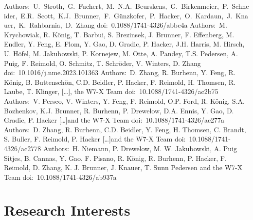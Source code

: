 \documentclass[11pt,a4paper]{moderncv}
\begin{document}
%
{Authors:~U.~Stroth,~G.~Fuchert,~M.~N.A.~Beurskens,~G.~Birkenmeier,~P.~Schneider,~E.R.~Scott,~K.J.~Brunner,~F.~Günzkofer,~P.~Hacker,~O.~Kardaun,~J.~Knauer,~K.~Rahbarnia,~D.~Zhang}{%
    doi:~0.1088/1741-4326/abbc4a}{}{}
{Authors:~M. Krychowiak, R. König, T. Barbui, S. Brezinsek, J. Brunner, F. Effenberg, M. Endler, Y. Feng, E. Flom, Y. Gao, D. Gradic, P. Hacker, J.H. Harris, M. Hirsch, U. Höfel, M. Jakubowski, P. Kornejew, M. Otte, A. Pandey, T.S. Pedersen, A. Puig, F. Reimold, O. Schmitz, T. Schröder, V. Winters, D. Zhang}{%
    doi:~10.1016/j.nme.2023.101363}{}{}%
{Authors:~D. Zhang, R. Burhenn, Y. Feng, R. König, B. Buttenschön, C.D. Beidler, P. Hacker, F. Reimold, H. Thomsen, R. Laube, T. Klinger, [\dots],  the W7-X Team}{%
    doi:~10.1088/1741-4326/ac2b75}{}{}%
{Authors:~V. Perseo, V. Winters, Y. Feng, F. Reimold, O.P. Ford, R. König, S.A. Bozhenkov, K.J. Brunner, R. Burhenn, P. Drewelow, D.A. Ennis, Y. Gao, D. Gradic, P. Hacker [\dots]and the W7-X Team}{%
    doi:~10.1088/1741-4326/ac277a}{}{}%
{Authors:~D. Zhang, R. Burhenn, C.D. Beidler, Y. Feng, H. Thomsen, C. Brandt, S. Buller, F. Reimold, P. Hacker [\dots]and the W7-X Team}{%
    doi:~10.1088/1741-4326/ac2778}{}{}%
{Authors:~H. Niemann, P. Drewelow, M. W. Jakubowski, A. Puig Sitjes, B. Cannas, Y. Gao, F. Pisano, R. König, R. Burhenn, P. Hacker, F. Reimold, D. Zhang, K. J. Brunner, J. Knauer, T. Sunn Pedersen and the W7-X Team}{%
    doi:~10.1088/1741-4326/ab937a}{}{}%


\section{Research Interests}
\end{document}
